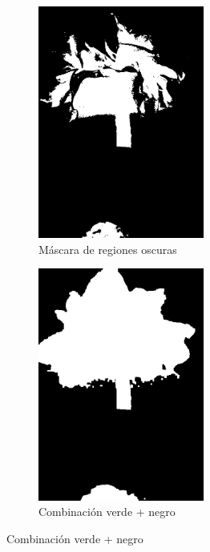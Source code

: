 \begin{figure}[H]
\centering
\begin{subfigure}[b]{0.48\textwidth}
    \centering
    \includegraphics[width=0.6\textwidth]{imagenes/clasificador_3_negro.jpg}
    \caption{Máscara de regiones oscuras}
\end{subfigure}
\hfill
\begin{subfigure}[b]{0.48\textwidth}
    \centering
    \includegraphics[width=0.6\textwidth]{imagenes/clasificador_4_combinado.jpg}
    \caption{Combinación verde + negro}
\end{subfigure}


\end{figure}
